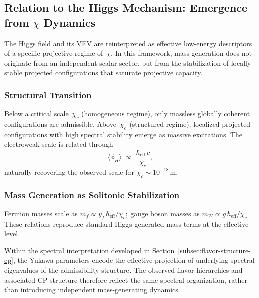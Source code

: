 \subsection{Relation to the Higgs Mechanism: Emergence from \texorpdfstring{$\chi$}{χ} Dynamics}
  \label{subsec:relation-to-the-higgs-mechanism}

  The Higgs field and its VEV are reinterpreted as effective low-energy
  descriptors of a specific projective regime of~$\chi$.
  In this framework, mass generation does not originate from an
  independent scalar sector, but from the stabilization of locally
  stable projected configurations that saturate projective capacity.

  \subsubsection*{Structural Transition}
    \label{subsec:emergence-higgs-vev}
    \label{subsec:chi_c-electroweak-scale}

    Below a critical scale~$\chi_c$ (homogeneous regime), only massless
    globally coherent configurations are admissible.
    Above~$\chi_c$ (structured regime), localized projected configurations
    with high spectral stability emerge as massive excitations.
    The electroweak scale is related through
    \begin{equation}
      \langle \phi_H \rangle
      \;\propto\;
      \frac{\hbar_{\mathrm{eff}}\, c}{\chi_c},
    \end{equation}
    naturally recovering the observed scale for
    $\chi_c \sim 10^{-18}\,\mathrm{m}$.

  \subsubsection*{Mass Generation as Solitonic Stabilization}
    \label{subsec:mass-generation-solitons}

    Fermion masses scale as
    $m_f \propto y_f\,\hbar_{\mathrm{eff}}/\chi_c$;
    gauge boson masses as
    $m_W \propto g\,\hbar_{\mathrm{eff}}/\chi_c$.
    These relations reproduce standard Higgs-generated mass terms at the effective level.

    Within the spectral interpretation developed in
    Section~\ref{subsec:flavor-structure-cp},
    the Yukawa parameters encode the effective projection of underlying
    spectral eigenvalues of the admissibility structure.
    The observed flavor hierarchies and associated CP structure therefore
    reflect the same spectral organization,
    rather than introducing independent mass-generating dynamics.

